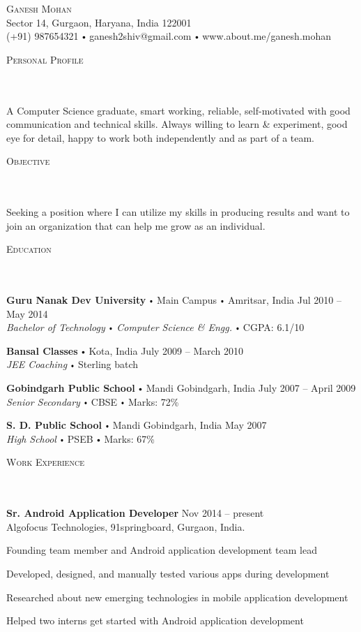 \documentclass{article}
\newcommand{\contact}[3]{
\vspace*{5pt}
\begin{center}
{\LARGE \scshape {#1}}\\
\vspace{3pt}
#2 
\vspace{2pt}
#3
\end{center}
\vspace*{-8pt}
}
\newcommand{\header}[1]{{
\hspace*{-15pt}\vspace*{6pt} \textsc{#1}} \vspace*{-6pt} 
\lineunder
}
\newcommand{\lineunder}{
\vspace*{-8pt} \\ \hspace*{-18pt} 
\hrulefill \\
}
\newcommand{\content}{
\vspace*{2pt}%
}
\newcommand{\college}[5]{\vspace*{2pt}%
\textbf{#1} \labelitemi #2 \labelitemi #3 \hfill #4 \\ #5 
\vspace*{5pt}
}
\newcommand{\school}[4]{
\textbf{#1} \labelitemi #2 \hfill #3 \\ #4 \vspace*{5pt}
}
\newcommand{\employer}[4]{{
\vspace*{2pt}%
\textbf{#1} #2 \hfill #3\\ #4 \vspace*{2pt}}
}
\renewcommand{\labelitemi}{
$\vcenter{\hbox{\tiny$\bullet$}}$\hspace*{3pt}
}
\renewcommand{\labelitemii}{
$\vcenter{\hbox{\tiny$\bullet$}}$\hspace*{-3pt}
}
\newenvironment{bullet-list-minor}{
\begin{list}{\labelitemii}{\setlength\leftmargin{15pt} 
\topsep 0pt \itemsep -2pt}}{\vspace*{4pt}\end{list}
}
\begin{document}
\small
\smallskip
\vspace*{-44pt}

\contact{Ganesh Mohan}
{Sector 14, Gurgaon, Haryana, India 122001\\}
{(+91) 987654321 \labelitemi ganesh2shiv@gmail.com \labelitemi www.about.me/ganesh.mohan}
\vspace{15pt}
\header{Personal Profile}
    \content{A Computer Science graduate, smart working, reliable, self-motivated with good communication and technical skills. Always willing to learn \& experiment, good eye for detail, happy to work both independently and as part of a team.\vspace{5pt}}

\vspace*{4pt}%
\header{Objective}
    \content{Seeking a position where I can utilize my skills in producing results and want to join an organization that can help me grow as an individual.\vspace{5pt}}

\vspace*{4pt}%
\header{Education}
    \college{Guru Nanak Dev University}{Main Campus}{Amritsar, India}{Jul 2010 -- May 2014}
    {\textit{Bachelor of Technology \labelitemi Computer Science \& Engg.}\labelitemi CGPA: 6.1/10}

    \school{Bansal Classes}{Kota, India}{July 2009 -- March 2010}
    {\textit{JEE Coaching} \labelitemi Sterling batch}

    \school{Gobindgarh Public School}{Mandi Gobindgarh, India}{July 2007 -- April 2009}
    {\textit{Senior Secondary} \labelitemi CBSE \labelitemi Marks: 72\%}

    \school{S. D. Public School}{Mandi Gobindgarh, India}{May 2007}
    {\textit{High School} \labelitemi PSEB \labelitemi Marks: 67\%}

\vspace*{4pt}%
\header{Work Experience}
    \employer{Sr. Android Application Developer}{}{Nov 2014 -- present}{Algofocus Technologies, 91springboard, Gurgaon, India.}
	\begin{bullet-list-minor}
	\item Founding team member and Android application development team lead
	\item Developed, designed, and manually tested various apps during development
	\item Researched about new emerging technologies in mobile application development
	\item Helped two interns get started with Android application development
    \end{bullet-list-minor}
\end{document}
